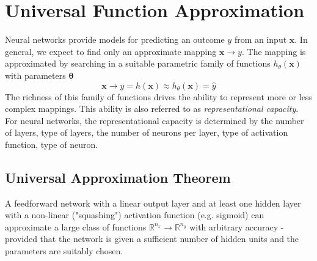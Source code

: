 \documentclass[11pt]{article}
\begin{document}
\section{Universal Function Approximation}
Neural networks provide models for predicting an outcome $y$ from an input $\textbf{x}$. In general, we expect to find only an approximate mapping $\textbf{x}\rightarrow y$. The mapping  is approximated by searching in a suitable parametric family of functions $h_\theta(\textbf{x})$ with parameters $\boldsymbol{\theta}$
\begin{equation*}
	\textbf{x} \rightarrow y = h(\textbf{x}) \approx h_\theta(\textbf{x}) = \widehat{y}
\end{equation*}
The richness of this family of functions drives the ability to represent more or less complex mappings. This ability is also referred to as \emph{representational capacity}. For neural networks, the representational capacity is determined by the number of layers, type of layers, the number of neurons per layer, type of activation function, type of neuron.

\subsection{Universal Approximation Theorem}

\begin{theorem}
	A feedforward network with a linear output layer and at least one hidden layer with a non-linear ("squashing") activation function (e.g. sigmoid) can approximate a large class of functions $\mathbb{R}^{n_x} \rightarrow \mathbb{R}^{n_y}$ with arbitrary accuracy - provided that the network is given a sufficient number of hidden units and the parameters are suitably chosen.
\end{theorem}
\end{document}
